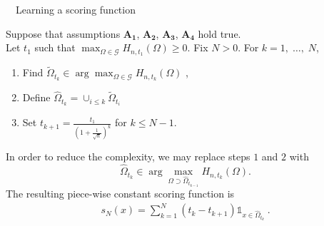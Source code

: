\begin{algorithm} 
\caption{~~Learning a scoring function}
\label{aistat:algo1} 
Suppose that assumptions $\mathbf{A_1}$, $\mathbf{A_2}$, $\mathbf{A_3}$, $\mathbf{A_4}$ hold true.\\ Let $t_1$ such that $\max_{\Omega \in \mathcal{G}}H_{n,t_1}(\Omega)
\ge  0$. 
Fix  $N>0$. %
For $k=1,\; \ldots,\; N$, 
\begin{enumerate} 
\item   Find  $\tilde{\Omega}_{t_k} \in \arg\max_{\Omega \in \mathcal{G}}
H_{n,t_k}(\Omega)$ , %
\item  Define $\hat \Omega_{t_k}= \cup_{i \le k} \tilde \Omega_{t_i}$
\item  Set  $ t_{k+1} =\frac{t_1}{(1+\frac{1}{\sqrt n})^{k}}   $ for $k\le N-1$. %
\end{enumerate} 

In order to reduce the complexity, we may replace steps $1$ and $2$
with $$\hat {\Omega}_{t_k} \in \arg\max_{\Omega \supset \hat \Omega_{t_{k-1}}} H_{n,t_k}(\Omega).$$
\noindent
The resulting piece-wise constant scoring function is
\begin{align}
\label{aistat:definition_sN}
s_N(x)= \sum_{k=1}^{N}(t_{k}-t_{k+1}) \mathds{1}_{x \in \hat{\Omega}_{t_k}}~.
\end{align}
\end{algorithm}




